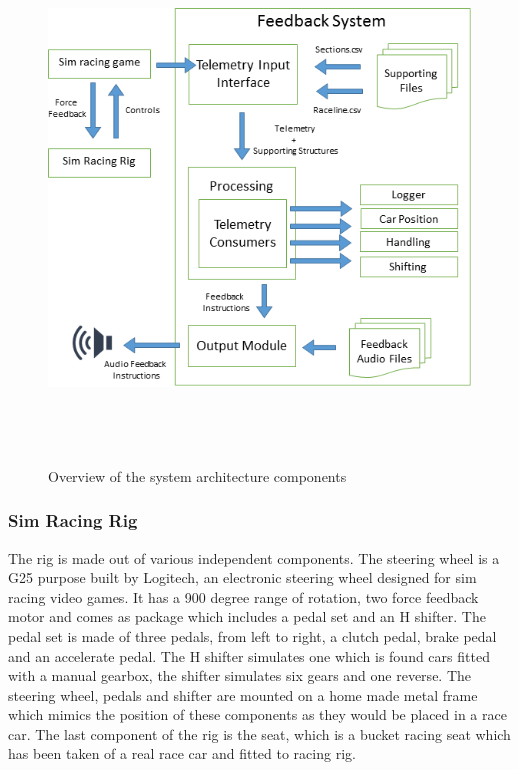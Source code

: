 \begin{figure}[!htb]
	\centering
	\includegraphics[height=14cm]{images/SystemArch}
	\caption{Overview of the system architecture components}
	\label{fig:SystemArch}
\end{figure}

\subsubsection{Sim Racing Rig}
The rig is made out of various independent components. The steering wheel is a G25 purpose built by Logitech, an electronic steering wheel designed for sim racing video games. It has a 900 degree range of rotation, two force feedback motor and comes as package which includes a pedal set and an H shifter. The pedal set is made of three pedals, from left to right, a clutch pedal, brake pedal and an accelerate pedal. The H shifter simulates one which is found cars fitted with a manual gearbox, the shifter simulates six gears and one reverse. The steering wheel, pedals and shifter are mounted on a home made metal frame which mimics the position of these components as they would be placed in a race car. The last component of the rig is the seat, which is a bucket racing seat which has been taken of a real race car and fitted to racing rig.

